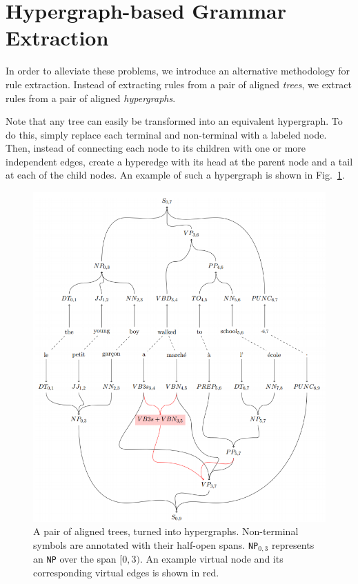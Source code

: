 \documentclass[nofonts]{pbml} %
\begin{document}
\section{Hypergraph-based Grammar Extraction}
\label{sec:hypergrex}
In order to alleviate these problems, we introduce an alternative methodology for rule extraction.
Instead of extracting rules from a pair of aligned \emph{trees}, we extract rules from a pair of
aligned \emph{hypergraphs}.

Note that any tree can easily be transformed into an equivalent hypergraph. To do this, simply replace
each terminal and non-terminal with a labeled node. Then, instead of connecting each node to its children
with one or more independent edges, create a hyperedge with its head at the parent node and a tail at each
of the child nodes. An example of such a hypergraph is shown in Fig.~\ref{virtualnodefig}.

\begin{figure}[ht!]
\centering
\includegraphics[scale=0.25]{virtualnode.png}
\caption{A pair of aligned trees, turned into hypergraphs. Non-terminal symbols are annotated with their half-open spans. \texttt{NP}$_{0,3}$ represents an \texttt{NP} over the span $[0,3)$.
An example virtual node and its corresponding virtual edges is shown in red.}
\label{virtualnodefig}
\end{figure}
\end{document}
